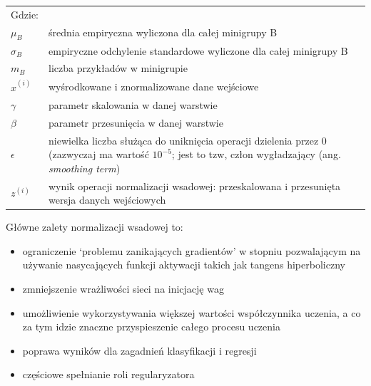\documentclass[a4paper,12pt]{article}
\numberwithin{figure}{section}
\begin{document}
    \begin{tabular}{p{}p{}}
        Gdzie: \\
        $\mu_{B}$           & średnia empiryczna wyliczona dla całej minigrupy B                                                                                                                \\
        $\sigma_{B}$        & empiryczne odchylenie standardowe wyliczone dla całej minigrupy B                                                                                                 \\
        $m_{B}$             & liczba przykładów w minigrupie                                                                                                                                    \\
        $\widehat{x}^{(i)}$ & wyśrodkowane i znormalizowane dane wejściowe                                                                                                                      \\
        $\gamma$            & parametr skalowania w danej warstwie                                                                                                                              \\
        $\beta$             & parametr przesunięcia w danej warstwie                                                                                                                            \\
        $\epsilon$          & niewielka liczba służąca do uniknięcia operacji dzielenia przez 0 (zazwyczaj ma wartość $10^{-5}$; jest to tzw, człon wygładzający (ang. \textit{smoothing term}) \\
        $z^{(i)}$           & wynik operacji normalizacji wsadowej: przeskalowana i przesunięta wersja danych wejściowych                                                                       \\
    \end{tabular}

    \bigskip

    Główne zalety normalizacji wsadowej to\cite{UczenieMaszynowe2018}:
    \begin{itemize}
        \item ograniczenie `problemu zanikających gradientów' w stopniu pozwalającym na używanie nasycających funkcji aktywacji takich jak tangens hiperboliczny
        \item zmniejszenie wrażliwości sieci na inicjację wag
        \item umożliwienie wykorzystywania większej wartości współczynnika uczenia, a co za tym idzie znaczne przyspieszenie całego procesu uczenia
        \item poprawa wyników dla zagadnień klasyfikacji i regresji
        \item częściowe spełnianie roli regularyzatora
    \end{itemize}
\end{document}
